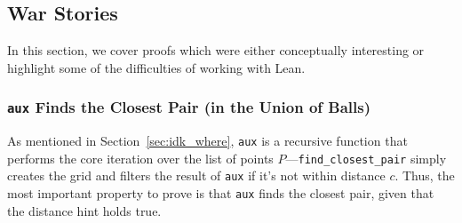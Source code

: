 \documentclass{article}
\begin{document}


\subsection{War Stories}\label{sec:war_stories}
In this section, we cover proofs which were either conceptually interesting or highlight some of the difficulties of working with Lean.

\subsubsection{{\large\texttt{aux}} Finds the Closest Pair (in the Union of Balls)}\label{sec:change_ih}

As mentioned in Section~\ref{sec:idk_where}, \texttt{aux} is a recursive function that performs the core iteration over the list of points $P$---\texttt{find\_closest\_pair} simply creates the grid and filters the result of \texttt{aux} if it's not within distance $c$.
Thus, the most important property to prove is that \texttt{aux} finds the closest pair, given that the distance hint holds true.
\end{document}
